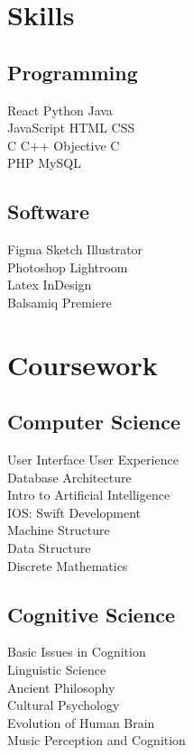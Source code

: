 \documentclass[]{deedy-resume-openfont}
\begin{document}
\begin{minipage}[t]{0.30\textwidth}
\section{Skills}
\subsection{Programming}
React \textbullet{} Python \textbullet{} Java\\
JavaScript \textbullet{} HTML \textbullet{}   CSS \\
C \textbullet{} C++ \textbullet{} Objective C \\
PHP \textbullet{} MySQL  \\
\sectionsep

\subsection{Software}
Figma \textbullet{} Sketch \textbullet{} Illustrator\\
Photoshop \textbullet{} Lightroom\\
Latex \textbullet{} InDesign\\
Balsamiq \textbullet{} Premiere\\
\sectionsep


\section{Coursework}

\subsection{Computer Science}
User Interface User Experience\\
Database Architecture\\
Intro to Artificial Intelligence\\
IOS: Swift Development\\
Machine Structure\\
Data Structure\\
Discrete Mathematics\\
\sectionsep

\subsection{Cognitive Science}
Basic Issues in Cognition\\
Linguistic Science\\
Ancient Philosophy\\
Cultural Psychology\\
Evolution of Human Brain\\
Music Perception and Cognition\\
\sectionsep


%
%

\end{minipage} 
\end{document}
